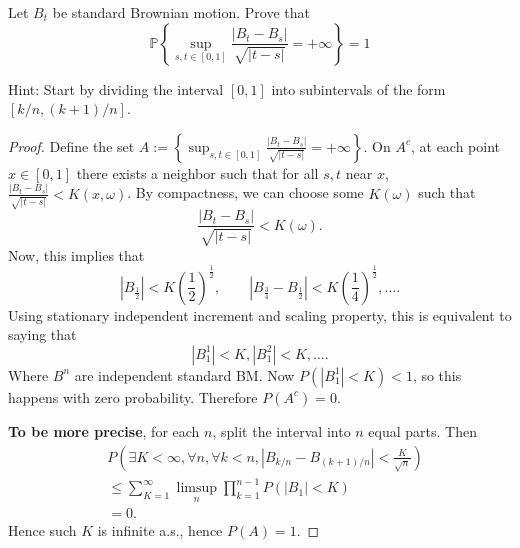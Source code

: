 \begin{problem}
	Let $B_t$ be standard Brownian motion. Prove that
\[
\mathbb{P}\left\{\sup _{s, t \in[0,1]} \frac{\left|B_t-B_s\right|}{\sqrt{|t-s|}}=+\infty\right\}=1
\]

Hint: Start by dividing the interval $[0,1]$ into subintervals of the form $[k / n,(k+1) / n]$.
\end{problem}
\begin{proof}
	Define the set $A := \left\{\sup _{s, t \in[0,1]} \frac{\left|B_t-B_s\right|}{\sqrt{|t-s|}}=+\infty\right\}$. On $A^c$, at each point $x \in [0,1]$ there exists a neighbor such that for all $s, t$ near $x$, $\frac{\left|B_t-B_s\right|}{\sqrt{|t-s|}} < K(x, \omega)$. By compactness, we can choose some $K(\omega)$ such that
	\[
		\frac{\left|B_t-B_s\right|}{\sqrt{|t-s|}} < K(\omega)
	.\] 
	Now, this implies that
	\[
		|B_{\frac{1}{2}}| < K \left( \frac{1}{2} \right) ^{\frac{1}{2}}, \qquad |B_{\frac{3}{4}} - B_{\frac{1}{2}}| < K \left( \frac{1}{4} \right) ^{\frac{1}{2}}, \ldots
	.\] 
	Using stationary independent increment and scaling property, this is equivalent to saying that
	\[
		|B_1^1| < K, |B_1^2| < K, \ldots
	.\] 
	Where $B^n$ are independent standard BM. Now $P(|B_1^1|< K) < 1$, so this happens with zero probability. Therefore $P(A^c) = 0$.

	\textbf{To be more precise}, for each $n$, split the interval into $n$ equal parts. Then
	\begin{align*}
		&P\left( \exists K < \infty , \forall n, \forall k < n, |B_{k / n} - B_{(k + 1) / n}|< \frac{K}{\sqrt{n} } \right) \\
		&\leq \sum_{K=1}^{\infty} \limsup_{n} \prod_{k=1}^{n-1} P\left( |B_1| < K \right)  \\
		&= 0
	.\end{align*}
	Hence such $K$ is infinite a.s., hence $P(A) = 1$.
\end{proof}

